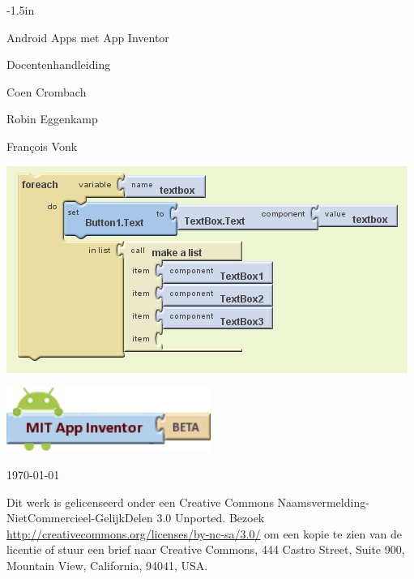 \documentclass{BYUTextbook}
\begin{document}
\frontmatter

\thispagestyle{empty}
\begin{adjustwidth}{}{-1.5in}

 \centering
 \vspace{.6in}
 \Huge Android Apps met App Inventor
 
 \Huge Docentenhandleiding
 \normalsize
 \vspace{.6in}

Coen Crombach

Robin Eggenkamp

Fran\c{c}ois Vonk

 \vspace{0.4in}

\includegraphics[width=\textwidth]{screenshots/building_blocks}

\vspace{0.25in}

\includegraphics[width=0.5\textwidth]{screenshots/AppInventorLogo}

 \vspace{.6in}

\today


\end{adjustwidth}

\null
\vfill
\ccbyncsaeu

\small{Dit werk is gelicenseerd onder een Creative Commons Naamsvermelding-NietCommercieel-GelijkDelen 3.0 Unported. Bezoek \url{http://creativecommons.org/licenses/by-nc-sa/3.0/} om een kopie te zien van de licentie of stuur een brief naar Creative Commons, 444 Castro Street, Suite 900, Mountain View, California, 94041, USA.}
\end{document}
